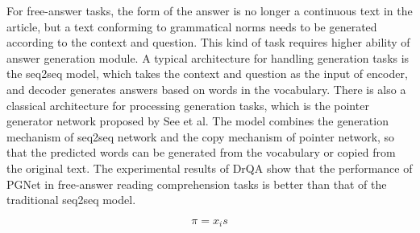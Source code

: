 \documentclass{article}
\begin{document}
For free-answer tasks, the form of the answer is no longer a continuous text in the article, but a text conforming to grammatical norms needs to be generated according to the context and question. This kind of task requires 
higher ability of answer generation module. A typical architecture for handling generation tasks is the seq2seq model, which takes the context and question as the input of encoder, and decoder generates answers based on words in the vocabulary. 
There is also a classical architecture for processing generation tasks, which is the pointer generator network proposed by See et al. 
The model combines the generation mechanism of seq2seq network and the copy mechanism of pointer network, so that the predicted words can be generated from the vocabulary or copied from the original text.
The experimental results of DrQA show that the performance of PGNet in free-answer reading comprehension tasks is better than that of the traditional seq2seq model.

\begin{equation}
	\pi=x_is
\end{equation}
\end{document}
